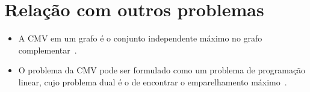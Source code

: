 \section{Relação com outros problemas}
\label{sec:relacao}

\begin{itemize}
    \item A CMV em um grafo é o conjunto independente
    máximo no grafo complementar~\cite{cite:wikimvc}.

    \item O problema da CMV pode ser formulado como um problema de programação
    linear, cujo problema dual é o de encontrar o emparelhamento
    máximo~\cite{cite:wikimvc}.
\end{itemize}


